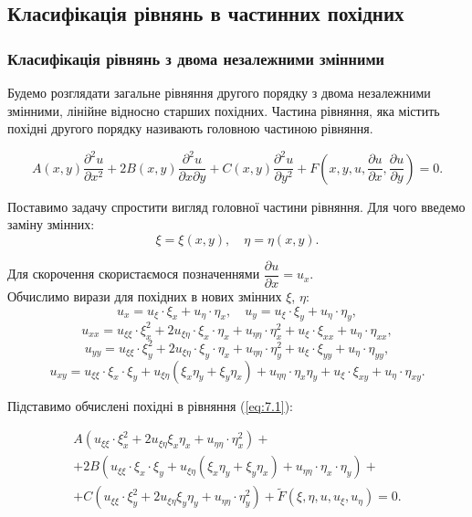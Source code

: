 
\subsection{Класифікація рівнянь в частинних похідних}

\subsubsection{Класифікація рівнянь з двома незалежними змінними}

Будемо розглядати загальне рівняння другого порядку з двома незалежними змінними, лінійне відносно старших похідних. Частина рівняння, яка містить похідні другого порядку називають головною частиною рівняння.

\begin{equation}
	\label{eq:7.1}
	A(x,y)\dfrac{\partial^2u}{\partial x^2}+2B(x,y)\dfrac{\partial^2u}{\partial x\partial y}+C(x,y)\dfrac{\partial^2u}{\partial y^2}+F\left(x,y,u,\dfrac{\partial u}{\partial x},\dfrac{\partial u}{\partial y}\right)=0.
\end{equation}

Поставимо задачу спростити вигляд головної частини рівняння. Для чого введемо заміну змінних: 
\begin{equation}
	\label{eq:7.2}
	\xi = \xi(x, y), \quad \eta = \eta(x, y).
\end{equation}

Для скорочення скористаємося позначеннями $\dfrac{\partial u}{\partial x} = u_x$. \\

Обчислимо вирази для похідних в нових змінних $\xi$, $\eta$:
\[ u_x = u_\xi \cdot \xi_x + u_\eta \cdot \eta_x, \quad u_y = u_\xi \cdot \xi_y + u_\eta \cdot \eta_y, \]
\[ u_{xx} = u_{\xi\xi} \cdot \xi_x^2 + 2 u_{\xi\eta} \cdot \xi_x \cdot \eta_x + u_{\eta\eta} \cdot \eta_x^2 + u_\xi \cdot \xi_{xx} + u_\eta \cdot \eta_{xx}, \]
\[ u_{yy} = u_{\xi\xi} \cdot \xi_y^2 + 2 u_{\xi\eta} \cdot \xi_y \cdot \eta_x + u_{\eta\eta} \cdot \eta_y^2 + u_\xi \cdot \xi_{yy} + u_\eta \cdot \eta_{yy}, \]
\[ u_{xy} = u_{\xi\xi} \cdot \xi_x \cdot \xi_y + u_{\xi\eta} (\xi_x \eta_y + \xi_y \eta_x) + u_{\eta\eta} \cdot \eta_x \eta_y + u_\xi \cdot \xi_{xy} + u_\eta \cdot \eta_{xy}. \]

Підставимо обчислені похідні в рівняння (\ref{eq:7.1}):

\begin{multline}
	\label{eq:7.3}
	A (u_{\xi\xi} \cdot \xi_x^2 + 2 u_{\xi\eta} \xi_x \eta_x + u_{\eta\eta} \cdot \eta_x^2 ) + \\
	+ 2 B(u_{\xi\xi} \cdot \xi_x \cdot \xi_y + u_{\xi\eta}(\xi_x\eta_y+\xi_y\eta_x)+u_{\eta\eta}\cdot\eta_x\cdot\eta_y) + \\
	+ C (u_{\xi\xi} \cdot \xi_y^2 + 2 u_{\xi\eta}\xi_y\eta_y + u_{\eta\eta}\cdot \eta_y^2) + \widetilde{F}(\xi, \eta, u, u_\xi, u_\eta) = 0.
\end{multline}

